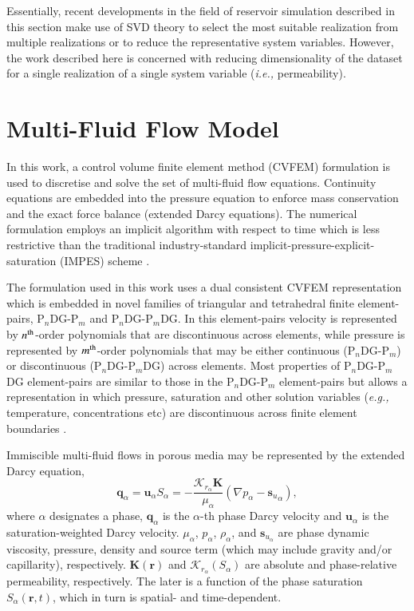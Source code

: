 \documentclass[preprint,12pt]{elsarticle}
\newcommand{\PN}[2][error]{P$_{#1}$DG-P$_{#2}$}
\newcommand{\PNDG}[2][error]{P$_{#1}$DG-P$_{#2}$DG}
\newcommand{\eg}{{\it e.g., }}
\newcommand{\ie}{{\it i.e., }}
\begin{document}
Essentially, recent developments in the field of reservoir simulation described in this section make use of SVD theory to select the most suitable realization from multiple realizations or to reduce the representative system variables. However, the work described here is concerned with reducing dimensionality of the dataset for a single realization of a single system variable (\ie{permeability}).


\section{Multi-Fluid Flow Model}\label{section:mathematical_model}

In this work, a control volume finite element method (CVFEM) formulation is used to discretise and solve the set of multi-fluid flow equations. Continuity equations are embedded into the pressure equation to enforce mass conservation and the exact force balance (extended Darcy equations). The numerical formulation employs an implicit algorithm with respect to time which is less restrictive than the traditional industry-standard implicit-pressure-explicit-saturation (IMPES) scheme \cite{aziz_1986,Chen_2007}.

The formulation used in this work uses a dual consistent CVFEM representation which is embedded in novel families of triangular and tetrahedral finite element-pairs, \PN[n]{m} and \PNDG[n]{m}. In this element-pairs velocity is represented by $n^{\rm th}$-order polynomials that are discontinuous across elements, while pressure is represented by $m^{\rm th}$-order polynomials that may be either continuous (\PN[n]{m}) or discontinuous (\PNDG[n]{m}) across elements. Most properties of \PNDG[n]{m} element-pairs are similar to those in the \PN[n]{m} element-pairs but allows a representation in which pressure, saturation and other solution variables (\eg temperature, concentrations etc) are discontinuous across finite element boundaries \cite{adam_2016, salinas_2018}.

Immiscible multi-fluid flows in porous media may be represented by the extended Darcy equation,
\begin{equation}\label{e:darcy_eqn}
  \mathbf{q}_{\alpha} = \mathbf{u}_{\alpha}S_\alpha=
  -\frac{\mathcal{K}_{{r}_\alpha}\mathbf{K}}{\mu_{\alpha}}\left(
  \nabla p_{\alpha} - {\mathbf{s}_{u}}_{\alpha} \right),
\end{equation}
where $\alpha$ designates a phase, $\mathbf{q}_{\alpha}$ is the $\alpha$-th phase Darcy velocity and $\mathbf{u}_{\alpha}$ is the saturation-weighted Darcy velocity. $\mu_{\alpha}$, $p_{\alpha}$, $\rho_{\alpha}$, and $\mathbf{s}_{{u}_\alpha}$ are phase dynamic viscosity, pressure, density and source term (which may include gravity and/or capillarity), respectively. $\mathbf{K}\left(\mathbf{r}\right)$ and $\mathcal{K}_{{r}_\alpha}\left(S_{\alpha}\right)$ are absolute and phase-relative permeability, respectively. The later is a function of the phase saturation $S_{\alpha}\left(\mathbf{r},t\right)$, which in turn is spatial- and time-dependent.
\end{document}
